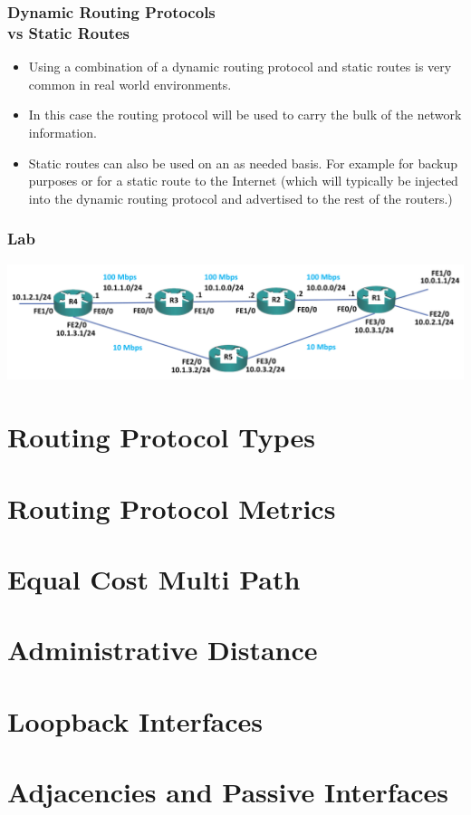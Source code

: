 \documentclass[pdflatex,compress,mathserif]{beamer}
\begin{document}
\begin{frame}
	\frametitle{Dynamic Routing Protocols\\vs Static Routes}
	\begin{itemize}
		\item Using a combination of a dynamic routing protocol and static routes is
very common in real world environments.
		\item In this case the routing protocol will be used to carry the bulk of the
network information.
		\item Static routes can also be used on an as needed basis. For example for
backup purposes or for a static route to the Internet (which will typically
be injected into the dynamic routing protocol and advertised to the rest
of the routers.)
	\end{itemize}
\end{frame}

\begin{frame}
	\frametitle{Lab}
	\begin{center}
		\includegraphics[width=\linewidth]{img/img06}
	\end{center}
\end{frame}

\section{Routing Protocol Types}

\section{Routing Protocol Metrics}

\section{Equal Cost Multi Path}

\section{Administrative Distance}

\section{Loopback Interfaces}

\section{Adjacencies and Passive Interfaces}
\end{document}

